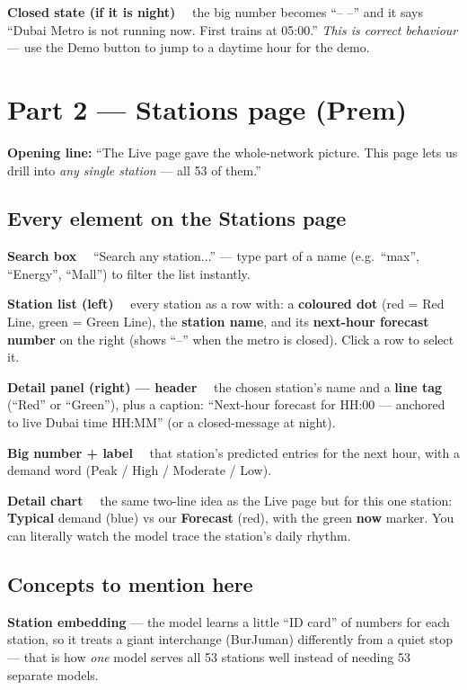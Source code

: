 \documentclass[11pt]{article}
\newcommand{\term}[1]{\noindent\textbf{\color{ink}#1} --- }
\newcommand{\elem}[1]{\smallskip\noindent\textbf{\color{metroRed}#1}\ \ }
\begin{document}
\elem{Closed state (if it is night)} the big number becomes ``-- --'' and it says ``Dubai Metro is
not running now. First trains at 05:00.'' \emph{This is correct behaviour} --- use the Demo button to
jump to a daytime hour for the demo.

\section{Part 2 --- Stations page \textnormal{(Prem)}}
\textbf{Opening line:} ``The Live page gave the whole-network picture. This page lets us drill into
\emph{any single station} --- all 53 of them.''

\subsection{Every element on the Stations page}
\elem{Search box} ``Search any station...'' --- type part of a name (e.g.\ ``max'', ``Energy'',
``Mall'') to filter the list instantly.

\elem{Station list (left)} every station as a row with: a \textbf{coloured dot} (red = Red Line,
green = Green Line), the \textbf{station name}, and its \textbf{next-hour forecast number} on the
right (shows ``--'' when the metro is closed). Click a row to select it.

\elem{Detail panel (right) --- header} the chosen station's name and a \textbf{line tag} (``Red'' or
``Green''), plus a caption: ``Next-hour forecast for HH:00 --- anchored to live Dubai time HH:MM''
(or a closed-message at night).

\elem{Big number + label} that station's predicted entries for the next hour, with a demand word
(Peak / High / Moderate / Low).

\elem{Detail chart} the same two-line idea as the Live page but for this one station: \textbf{Typical}
demand (blue) vs our \textbf{Forecast} (red), with the green \textbf{now} marker. You can literally
watch the model trace the station's daily rhythm.

\subsection{Concepts to mention here}
\term{Station embedding} the model learns a little ``ID card'' of numbers for each station, so it
treats a giant interchange (BurJuman) differently from a quiet stop --- that is how \emph{one} model
serves all 53 stations well instead of needing 53 separate models.
\end{document}
